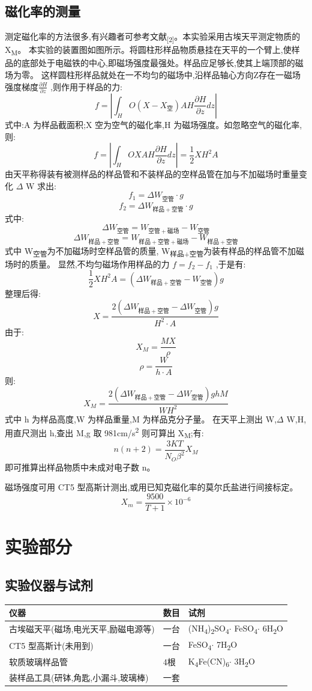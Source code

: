 \documentclass[11pt]{report}
\begin{document}
\chapter{磁化率的测量}
\label{sec:orgbfdf49a}
测定磁化率的方法很多,有兴趣者可参考文献\textsubscript{[2]}。本实验采用古埃天平测定物质的 X\textsubscript{M}。
本实验的装置图如图所示。将圆柱形样品物质悬挂在天平的一个臂上,使样
品的底部处于电磁铁的中心,即磁场强度最强处。样品应足够长,使其上端顶部的磁场为零。
这样圆柱形样品就处在一不均匀的磁场中,沿样品轴心方向Z存在一磁场强度梯度\(\frac{\partial H}{\partial z}\) ,则作用于样品的力:
\[
f=\left|\int_{H}{O}(X-X_{空})AH\frac{\partial H}{\partial z}dz\right|
\]
式中:A 为样品截面积;X 空为空气的磁化率,H 为磁场强度。如忽略空气的磁化率,则:
\[
f=\left|\int_{H}{O}XAH\frac{\partial H}{\partial z}dz\right|=\frac{1}{2}XH^{2}A
\]
由天平称得装有被测样品的样品管和不装样品的空样品管在加与不加磁场时重量变化
\(\Delta\) W 求出:
\[
f_{1}=\Delta W_{空管}\cdot g
\]
\[
f_{2}=\Delta W_{样品+空管}\cdot g
\]
式中:
\[
\Delta W_{空管}=W_{空管+磁场}-W_{空管}
\]
\[
\Delta W_{样品+空管}=W_{样品+空管+磁场}-W_{样品+空管}
\]
式中 W\textsubscript{空管}为不加磁场时空样品管的质量, W\textsubscript{样品+空管}为装有样品的样品管不加磁场时的质量。
显然,不均匀磁场作用样品的力 \(f = f_{2}-f_{1}\) ,于是有:
\[
\frac{1}{2}XH^{2}A=(\Delta W_{样品+空管}-W_{空管})g
\]
整理后得:
\[
X=\frac{2(\Delta W_{样品+空管}-\Delta W_{空管})g}{H^{2}\cdot A}
\]
由于:
\[
X_{M}=\frac{MX}{\rho}
\]
\[
\rho=\frac{W}{h\cdot A}
\]
则:
\[
X_{M}=\frac{2(\Delta W_{样品+空管}-\Delta W_{空管})ghM}{WH^{2}}
\]
式中 h 为样品高度,W 为样品重量,M 为样品克分子量。
在天平上测出 W,\(\Delta\) W,H,用直尺测出 h,查出 M,g 取 981cm/s\textsuperscript{2} 则可算出 X\textsubscript{M};有:
\[
n(n+2)=\frac{3KT}{N_{O}\beta^{2}}X_{M}
\]
即可推算出样品物质中未成对电子数 n。

磁场强度可用 CT5 型高斯计测出,或用已知克磁化率的莫尔氏盐进行间接标定。
\[
X_{m}=\frac{9500}{T+1}\times 10^{-6}
\]
\part{实验部分}
\label{sec:org964908d}
\chapter{实验仪器与试剂}
\label{sec:orgf31db55}
\begin{center}
\begin{tabular}{lll}
仪器 & 数目 & 试剂\\
\hline
古埃磁天平(磁场,电光天平,励磁电源等) & 一台 & (NH\textsubscript{4})\textsubscript{2}SO\textsubscript{4}\(\cdot\) FeSO\textsubscript{4}\(\cdot\) 6H\textsubscript{2}O\\
CT5 型高斯计(未用到) & 一台 & FeSO\textsubscript{4}\(\cdot\) 7H\textsubscript{2}O\\
软质玻璃样品管 & 4根 & K\textsubscript{4}Fe(CN)\textsubscript{6}\(\cdot\) 3H\textsubscript{2}O\\
装样品工具(研钵,角匙,小漏斗,玻璃棒) & 一套 & \\
\end{tabular}
\end{center}
\end{document}
